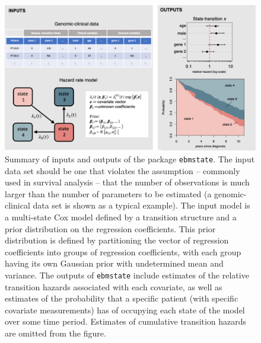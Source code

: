 \begin{figure}[h] 
    \centering         
    \includegraphics[width=14.5cm, angle=0]{figures/package_summary_figure.pdf} 
    \caption{Summary of inputs and outputs of the package \texttt{ebmstate}.  The input data set should be one that violates the assumption -- commonly used in survival analysis -- that the number of observations is much larger than the number of parameters to be estimated (a genomic-clinical data set is shown as a typical example). The input model is a multi-state Cox model defined by a transition structure and a prior distribution on the regression coefficients.  This prior distribution is defined by partitioning the vector of regression coefficients into groups of regression coefficients, with each group having its own Gaussian prior with undetermined mean and variance.  The outputs of \texttt{ebmstate} include estimates of the relative transition hazards associated with each covariate, as well as estimates of the probability that a specific patient (with specific covariate measurements) has of occupying each state of the model over some time period. Estimates of cumulative transition hazards are omitted from the figure.}      
    \label{fig:package_summary_figure} 
    \end{figure} 
    
